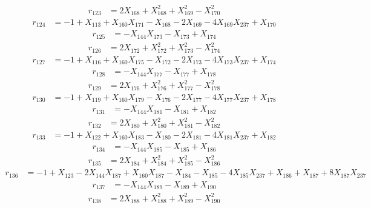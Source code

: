 \begin{align*}
r_{123}&=2X_{168}+X_{168}^{2}+X_{169}^{2}-X_{170}^{2}
\end{align*}
\begin{align*}
r_{124}&=-1+X_{113}+X_{160}X_{171}-X_{168}-2X_{169}-4X_{169}X_{237}+X_{170}
\end{align*}
\begin{align*}
r_{125}&=-X_{144}X_{173}-X_{173}+X_{174}
\end{align*}
\begin{align*}
r_{126}&=2X_{172}+X_{172}^{2}+X_{173}^{2}-X_{174}^{2}
\end{align*}
\begin{align*}
r_{127}&=-1+X_{116}+X_{160}X_{175}-X_{172}-2X_{173}-4X_{173}X_{237}+X_{174}
\end{align*}
\begin{align*}
r_{128}&=-X_{144}X_{177}-X_{177}+X_{178}
\end{align*}
\begin{align*}
r_{129}&=2X_{176}+X_{176}^{2}+X_{177}^{2}-X_{178}^{2}
\end{align*}
\begin{align*}
r_{130}&=-1+X_{119}+X_{160}X_{179}-X_{176}-2X_{177}-4X_{177}X_{237}+X_{178}
\end{align*}
\begin{align*}
r_{131}&=-X_{144}X_{181}-X_{181}+X_{182}
\end{align*}
\begin{align*}
r_{132}&=2X_{180}+X_{180}^{2}+X_{181}^{2}-X_{182}^{2}
\end{align*}
\begin{align*}
r_{133}&=-1+X_{122}+X_{160}X_{183}-X_{180}-2X_{181}-4X_{181}X_{237}+X_{182}
\end{align*}
\begin{align*}
r_{134}&=-X_{144}X_{185}-X_{185}+X_{186}
\end{align*}
\begin{align*}
r_{135}&=2X_{184}+X_{184}^{2}+X_{185}^{2}-X_{186}^{2}
\end{align*}
\begin{align*}
r_{136}&=-1+X_{123}-2X_{144}X_{187}+X_{160}X_{187}-X_{184}-X_{185}-4X_{185}X_{237}+X_{186}+X_{187}+8X_{187}X_{237}
\end{align*}
\begin{align*}
r_{137}&=-X_{144}X_{189}-X_{189}+X_{190}
\end{align*}
\begin{align*}
r_{138}&=2X_{188}+X_{188}^{2}+X_{189}^{2}-X_{190}^{2}
\end{align*}
